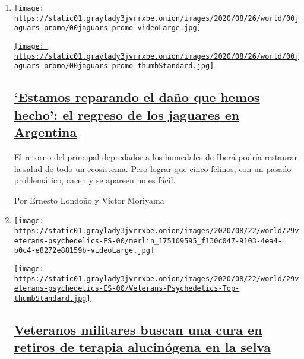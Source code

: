 \begin{enumerate}
\def\labelenumi{\arabic{enumi}.}
\item
  \texttt{[image: https://static01.graylady3jvrrxbe.onion/images/2020/08/26/world/00jaguars-promo/00jaguars-promo-videoLarge.jpg]}

  \href{/es/2020/09/01/espanol/america-latina/ibera-conservacion-jaguares-argentina.html}{\texttt{[image: https://static01.graylady3jvrrxbe.onion/images/2020/08/26/world/00jaguars-promo/00jaguars-promo-thumbStandard.jpg]}}

  \hypertarget{estamos-reparando-el-dauxf1o-que-hemos-hecho-el-regreso-de-los-jaguares-en-argentina}{%
  \subsection{\texorpdfstring{\href{/es/2020/09/01/espanol/america-latina/ibera-conservacion-jaguares-argentina.html}{`Estamos
  reparando el daño que hemos hecho': el regreso de los jaguares en
  Argentina}}{`Estamos reparando el daño que hemos hecho': el regreso de los jaguares en Argentina}}\label{estamos-reparando-el-dauxf1o-que-hemos-hecho-el-regreso-de-los-jaguares-en-argentina}}

  El retorno del principal depredador a los humedales de Iberá podría
  restaurar la salud de todo un ecosistema. Pero lograr que cinco
  felinos, con un pasado problemático, cacen y se apareen no es fácil.

  Por Ernesto Londoño y Victor Moriyama
\item
  \texttt{[image: https://static01.graylady3jvrrxbe.onion/images/2020/08/22/world/29veterans-psychedelics-ES-00/merlin\_175109595\_f130c047-9103-4ea4-b0c4-e8272e88159b-videoLarge.jpg]}

  \href{/es/2020/08/30/espanol/america-latina/ayahuasca-costa-rica.html}{\texttt{[image: https://static01.graylady3jvrrxbe.onion/images/2020/08/22/world/29veterans-psychedelics-ES-00/Veterans-Psychedelics-Top-thumbStandard.jpg]}}

  \hypertarget{veteranos-militares-buscan-una-cura-en-retiros-de-terapia-alucinuxf3gena-en-la-selva}{%
  \subsection{\texorpdfstring{\href{/es/2020/08/30/espanol/america-latina/ayahuasca-costa-rica.html}{Veteranos
  militares buscan una cura en retiros de terapia alucinógena en la
  selva}}{Veteranos militares buscan una cura en retiros de terapia alucinógena en la selva}}\label{veteranos-militares-buscan-una-cura-en-retiros-de-terapia-alucinuxf3gena-en-la-selva}}


\end{enumerate}
